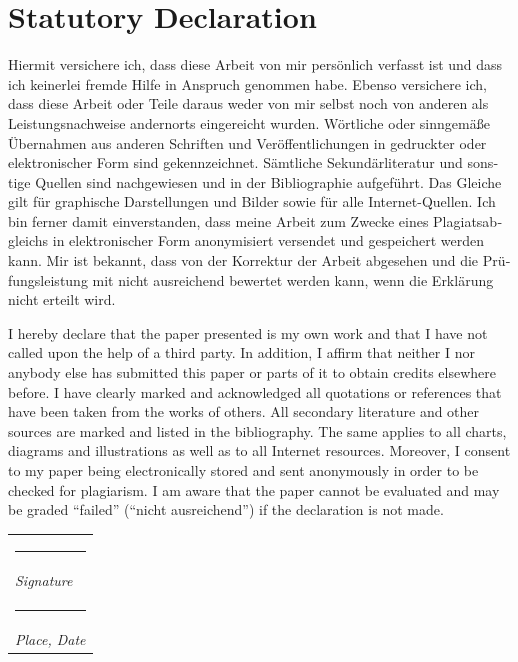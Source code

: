 \documentclass[11pt, letterpaper]{article} %
\makeatletter
\newcommand{\signature}[2][5cm]{%
  \begin{tabular}{@{}p{#1}@{}}
    #2 \\[2\normalbaselineskip] \hrule \\[0pt]
    {\small \textit{Signature}} \\[2\normalbaselineskip] \hrule \\[0pt]
    {\small \textit{Place, Date}}
  \end{tabular}
}
\makeatother
\begin{document}
\blindtext %

\newpage %
\thispagestyle{empty} %
\section*{Statutory Declaration} %

\begin{otherlanguage}{german}
Hiermit versichere ich, dass diese Arbeit von mir pers\"{o}nlich verfasst ist und dass ich keinerlei fremde Hilfe in Anspruch genommen habe. Ebenso versichere ich, dass diese Arbeit oder Teile daraus weder von mir selbst noch von anderen als Leistungsnachweise andernorts eingereicht wurden. W\"{o}rtliche oder sinngem\"{a}{\ss}e \"{U}bernahmen aus anderen Schriften und Ver\"{o}ffentlichungen in gedruckter oder elektronischer Form sind gekennzeichnet. S\"{a}mtliche Sekund\"{a}rliteratur und sonstige Quellen sind nachgewiesen und in der Bibliographie aufgef\"{u}hrt. Das Gleiche gilt f\"{u}r graphische Darstellungen und Bilder sowie f\"{u}r alle Internet-Quellen. Ich bin ferner damit einverstanden, dass meine Arbeit zum Zwecke eines Plagiatsabgleichs in elektronischer Form anonymisiert versendet und gespeichert werden kann. Mir ist bekannt, dass von der Korrektur der Arbeit abgesehen und die Pr\"{u}fungsleistung mit nicht ausreichend bewertet werden kann, wenn die Erkl\"{a}rung nicht erteilt wird.
\end{otherlanguage}

\vspace*{1in} %

\noindent I hereby declare that the paper presented is my own work and that I have not called upon the help of a third party. In addition, I affirm that neither I nor anybody else has submitted this paper or parts of it to obtain credits elsewhere before. I have clearly marked and acknowledged all quotations or references that have been taken from the works of others. All secondary literature and other sources are marked and listed in the bibliography. The same applies to all charts, diagrams and illustrations as well as to all Internet resources. Moreover, I consent to my paper being electronically stored and sent anonymously in order to be checked for plagiarism. I am aware that the paper cannot be evaluated and may be graded ``failed'' (``nicht ausreichend'') if the declaration is not made.\\


\hfill \signature{}


\end{document}
